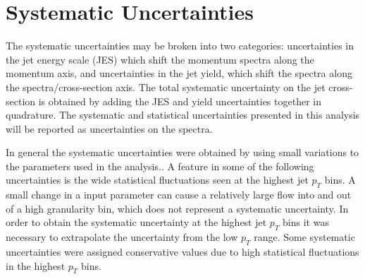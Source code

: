 
\section{Systematic Uncertainties}

The systematic uncertainties may be broken into two categories: uncertainties in the jet energy scale (JES) which shift the momentum spectra along the momentum axis, and uncertainties in the jet yield, which shift the spectra along the spectra/cross-section axis.  The total systematic uncertainty on the jet cross-section is obtained by adding the JES and yield uncertainties together in quadrature.  The systematic and statistical uncertainties presented in this analysis will be reported as uncertainties on the spectra.  

In general the systematic uncertainties were obtained by using small variations to the parameters used in the analysis..  A feature in some of the following uncertainties is the wide statistical fluctuations seen at the highest jet $p_{T}$ bins.  A small change in a input parameter can cause a relatively large flow into and out of a high granularity bin, which does not represent a systematic uncertainty.  In order to obtain the systematic uncertainty at the highest jet $p_{T}$ bins it was necessary to extrapolate the uncertainty from the low $p_{T}$ range.  Some systematic uncertainties were assigned conservative values due to high statistical fluctuations in the highest $p_{T}$ bins.  

